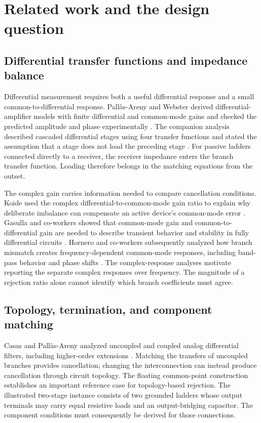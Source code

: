 \section{Related work and the design question}
\label{sec:related-work}

\subsection{Differential transfer functions and impedance balance}
Differential measurement requires both a useful differential response and a small common-to-differential response. Pall\`as-Areny and Webster derived differential-amplifier models with finite differential and common-mode gains and checked the predicted amplitude and phase experimentally \citep{pallasareny1991cmrr}. The companion analysis described cascaded differential stages using four transfer functions and stated the assumption that a stage does not load the preceding stage \citep{pallasareny1991cascaded}. For passive ladders connected directly to a receiver, the receiver impedance enters the branch transfer function. Loading therefore belongs in the matching equations from the outset.

The complex gain carries information needed to compare cancellation conditions. Koide used the complex differential-to-common-mode gain ratio to explain why deliberate imbalance can compensate an active device's common-mode error \citep{koide1997redef}. Gasulla and co-workers showed that common-mode gain and common-to-differential gain are needed to describe transient behavior and stability in fully differential circuits \citep{gasulla2002cmresp}. Hornero and co-workers subsequently analyzed how branch mismatch creates frequency-dependent common-mode responses, including band-pass behavior and phase shifts \citep{hornero2021cm}. The complex-response analyses motivate reporting the separate complex responses over frequency. The magnitude of a rejection ratio alone cannot identify which branch coefficients must agree.

\subsection{Topology, termination, and component matching}
Casas and Pall\`as-Areny analyzed uncoupled and coupled analog differential filters, including higher-order extensions \citep{casas1996basics}. Matching the transfers of uncoupled branches provides cancellation; changing the interconnection can instead produce cancellation through circuit topology. The floating common-point construction establishes an important reference case for topology-based rejection. The illustrated two-stage instance consists of two grounded ladders whose output terminals may carry equal resistive loads and an output-bridging capacitor. The component conditions must consequently be derived for those connections.

